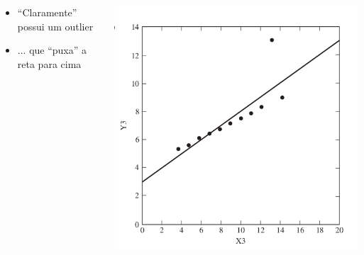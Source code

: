 \documentclass{beamer}
\begin{document}
\begin{frame}
  \begin{columns}
    \begin{column}{.5\textwidth}
      \begin{itemize}
        \tiny
      \item<2> ``Claramente'' possui um outlier
      \item<3> ... que ``puxa'' a reta para cima
      \end{itemize}
    \end{column}
    \begin{column}{.5\textwidth}
      \begin{center}
        \includegraphics[width=\textwidth]{EDA/eda-dispersao3}
      \end{center}
    \end{column}
  \end{columns}
\end{frame}
\end{document}
